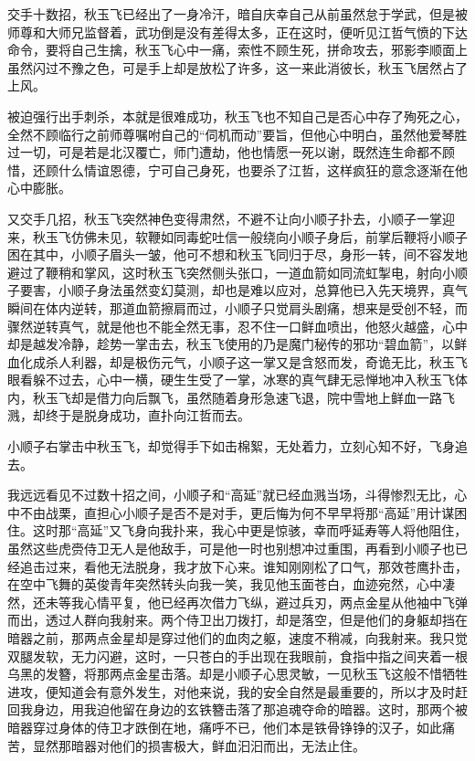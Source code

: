 交手十数招，秋玉飞已经出了一身冷汗，暗自庆幸自己从前虽然怠于学武，但是被师尊和大师兄监督着，武功倒是没有差得太多，正在这时，便听见江哲气愤的下达命令，要将自己生擒，秋玉飞心中一痛，索性不顾生死，拼命攻去，邪影李顺面上虽然闪过不豫之色，可是手上却是放松了许多，这一来此消彼长，秋玉飞居然占了上风。

被迫强行出手刺杀，本就是很难成功，秋玉飞也不知自己是否心中存了殉死之心，全然不顾临行之前师尊嘱咐自己的“伺机而动”要旨，但他心中明白，虽然他爱琴胜过一切，可是若是北汉覆亡，师门遭劫，他也情愿一死以谢，既然连生命都不顾惜，还顾什么情谊恩德，宁可自己身死，也要杀了江哲，这样疯狂的意念逐渐在他心中膨胀。

又交手几招，秋玉飞突然神色变得肃然，不避不让向小顺子扑去，小顺子一掌迎来，秋玉飞仿佛未见，软鞭如同毒蛇吐信一般绕向小顺子身后，前掌后鞭将小顺子困在其中，小顺子眉头一皱，他可不想和秋玉飞同归于尽，身形一转，间不容发地避过了鞭稍和掌风，这时秋玉飞突然侧头张口，一道血箭如同流虹掣电，射向小顺子要害，小顺子身法虽然变幻莫测，却也是难以应对，总算他已入先天境界，真气瞬间在体内逆转，那道血箭擦肩而过，小顺子只觉肩头剧痛，想来是受创不轻，而骤然逆转真气，就是他也不能全然无事，忍不住一口鲜血喷出，他怒火越盛，心中却是越发冷静，趁势一掌击去，秋玉飞使用的乃是魔门秘传的邪功“碧血箭”，以鲜血化成杀人利器，却是极伤元气，小顺子这一掌又是含怒而发，奇诡无比，秋玉飞眼看躲不过去，心中一横，硬生生受了一掌，冰寒的真气肆无忌惮地冲入秋玉飞体内，秋玉飞却是借力向后飘飞，虽然随着身形急速飞退，院中雪地上鲜血一路飞溅，却终于是脱身成功，直扑向江哲而去。

小顺子右掌击中秋玉飞，却觉得手下如击棉絮，无处着力，立刻心知不好，飞身追去。

我远远看见不过数十招之间，小顺子和“高延”就已经血溅当场，斗得惨烈无比，心中不由战栗，直担心小顺子是否不是对手，更后悔为何不早早将那“高延”用计谋困住。这时那“高延”又飞身向我扑来，我心中更是惊骇，幸而呼延寿等人将他阻住，虽然这些虎赍侍卫无人是他敌手，可是他一时也别想冲过重围，再看到小顺子也已经追击过来，看他无法脱身，我才放下心来。谁知刚刚松了口气，那效苍鹰扑击，在空中飞舞的英俊青年突然转头向我一笑，我见他玉面苍白，血迹宛然，心中凄然，还未等我心情平复，他已经再次借力飞纵，避过兵刃，两点金星从他袖中飞弹而出，透过人群向我射来。两个侍卫出刀拨打，却是落空，但是他们的身躯却挡在暗器之前，那两点金星却是穿过他们的血肉之躯，速度不稍减，向我射来。我只觉双腿发软，无力闪避，这时，一只苍白的手出现在我眼前，食指中指之间夹着一根乌黑的发簪，将那两点金星击落。却是小顺子心思灵敏，一见秋玉飞这般不惜牺牲进攻，便知道会有意外发生，对他来说，我的安全自然是最重要的，所以才及时赶回我身边，用我迫他留在身边的玄铁簪击落了那追魂夺命的暗器。这时，那两个被暗器穿过身体的侍卫才跌倒在地，痛呼不已，他们本是铁骨铮铮的汉子，如此痛苦，显然那暗器对他们的损害极大，鲜血汩汩而出，无法止住。


